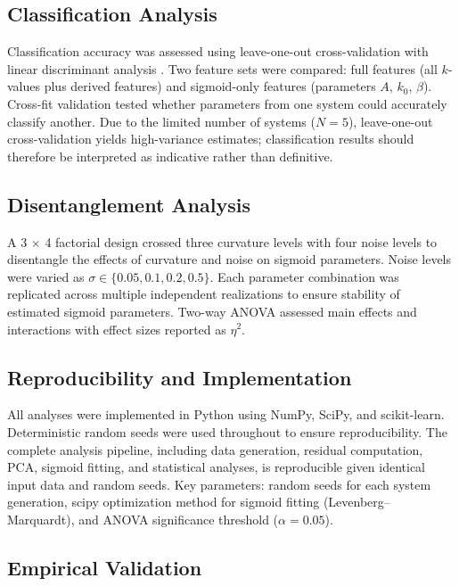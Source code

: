 \documentclass[11pt]{article}
\begin{document}
\subsection{Classification Analysis}

Classification accuracy was assessed using leave-one-out cross-validation with linear discriminant analysis \citep{ward1963hierarchical}. Two feature sets were compared: full features (all $k$-values plus derived features) and sigmoid-only features (parameters $A$, $k_0$, $\beta$). Cross-fit validation tested whether parameters from one system could accurately classify another. Due to the limited number of systems ($N = 5$), leave-one-out cross-validation yields high-variance estimates; classification results should therefore be interpreted as indicative rather than definitive.

\subsection{Disentanglement Analysis}

A 3 $\times$ 4 factorial design crossed three curvature levels with four noise levels to disentangle the effects of curvature and noise on sigmoid parameters. Noise levels were varied as $\sigma \in \{0.05, 0.1, 0.2, 0.5\}$. Each parameter combination was replicated across multiple independent realizations to ensure stability of estimated sigmoid parameters. Two-way ANOVA assessed main effects and interactions with effect sizes reported as $\eta^2$.

\subsection{Reproducibility and Implementation}
All analyses were implemented in Python using NumPy, SciPy, and scikit-learn. Deterministic random seeds were used throughout to ensure reproducibility. The complete analysis pipeline, including data generation, residual computation, PCA, sigmoid fitting, and statistical analyses, is reproducible given identical input data and random seeds. Key parameters: random seeds for each system generation, scipy optimization method for sigmoid fitting (Levenberg--Marquardt), and ANOVA significance threshold ($\alpha = 0.05$).

\subsection{Empirical Validation}
\end{document}
